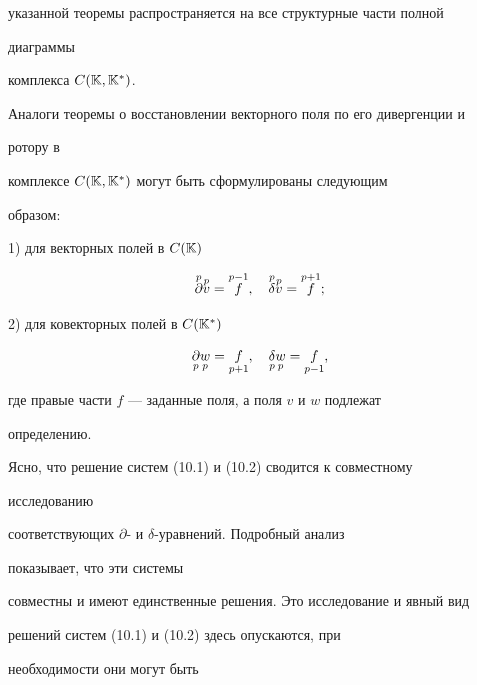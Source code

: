 указанной теоремы распространяется на все структурные части полной 


диаграммы  


комплекса $C(\Bbb K,\Bbb K^*)$. 


 


Аналоги теоремы о восстановлении векторного поля по его дивергенции и 


ротору в  


комплексе $C(\Bbb K,\Bbb K^*)$ могут быть сформулированы следующим 


образом: 


 


1) для векторных полей в $C(\Bbb K)$ 


\begin{equation} 


\up{p}{\partial}\up{p}{v}=\up{p-1}{f},\quad 


\up{p}{\delta}\up{p}{v}=\up{p+1}{f}; 


\end{equation} 


 


2) для ковекторных полей в $C(\Bbb K^*)$ 


\begin{equation} 


\down{p}{\partial}\down{p}{w}=\down{p+1}{f},\quad 


\down{p}{\delta}\down{p}{w}=\down{p-1}{f}, 


\end{equation} 


где правые части $f$ --- заданные поля, а поля $v$ и $w$ подлежат 


определению. 


 


Ясно, что решение систем (10.1) и (10.2) сводится к совместному 


исследованию  


соответствующих $\partial$- и $\delta$-уравнений. Подробный анализ 


показывает, что эти системы  


совместны и имеют единственные решения. Это исследование и явный вид 


решений систем (10.1) и (10.2) здесь опускаются, при 


необходимости они могут быть  


